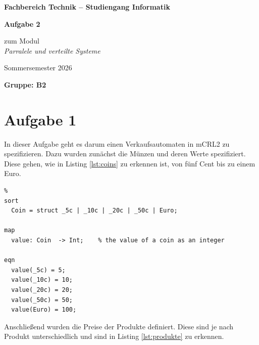 \documentclass{article}
\begin{document}
\begin{titlepage}
    \centering

   

    \textbf{Fachbereich Technik – Studiengang Informatik}
    \vspace{2.5cm}

    {\Huge\bfseries Aufgabe 2 \par}
    \vspace{1cm}
    {\Large zum Modul\\[0.3cm]
    \textit{Parralele und verteilte Systeme}\par}
    \vspace{1cm}
    {\large Sommersemester 2026\par}

    \vfill

    \begin{flushleft}
    \textbf{Gruppe: B2}
    \end{flushleft}
\end{titlepage}





\tableofcontents

\newpage




\section{Aufgabe 1}
In dieser Aufgabe geht es darum einen Verkaufsautomaten in mCRL2 zu spezifizieren. Dazu wurden zunächst die Münzen und deren Werte spezifiziert. Diese gehen, wie in Listing \ref{lst:coins} zu erkennen ist, von fünf Cent bis zu einem Euro.

\begin{lstlisting}[caption={Definition der Münzen},label={lst:coins}]
% Definition of the coins
%
sort
  Coin = struct _5c | _10c | _20c | _50c | Euro;

map
  value: Coin  -> Int;    % the value of a coin as an integer

eqn
  value(_5c) = 5;
  value(_10c) = 10;
  value(_20c) = 20;
  value(_50c) = 50;
  value(Euro) = 100;
\end{lstlisting}

Anschließend wurden die Preise der Produkte definiert. Diese sind je nach Produkt unterschiedlich und sind in Listing \ref{lst:produkte} zu erkennen.
\end{document}
